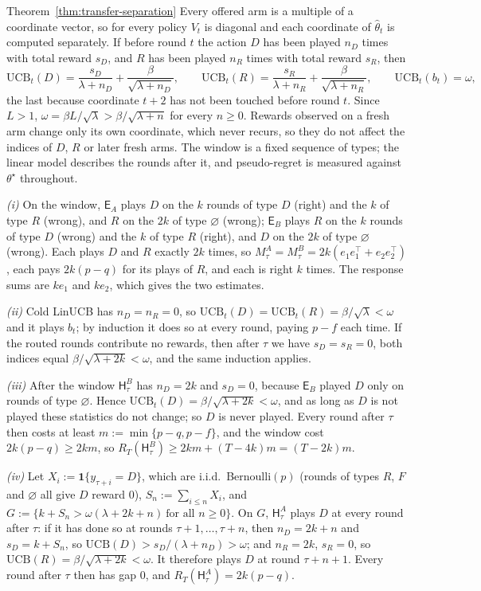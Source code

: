 \documentclass[anon]{alt2027} %
\newcommand{\ind}{\mathbf{1}}
\newcommand{\Exp}{\mathsf{E}}
\newcommand{\Hyb}{\mathsf{H}}
\begin{document}
\begin{proofof}{Theorem~\ref{thm:transfer-separation}}
Every offered arm is a multiple of a coordinate vector, so for every policy
$V_t$ is diagonal and each coordinate of $\widehat\theta_t$ is computed
separately. If before round $t$ the action $D$ has been played $n_D$ times with
total reward $s_D$, and $R$ has been played $n_R$ times with total reward
$s_R$, then
\[
\mathrm{UCB}_t(D)=\frac{s_D}{\lambda+n_D}+\frac{\beta}{\sqrt{\lambda+n_D}},\qquad
\mathrm{UCB}_t(R)=\frac{s_R}{\lambda+n_R}+\frac{\beta}{\sqrt{\lambda+n_R}},\qquad
\mathrm{UCB}_t(b_t)=\omega,
\]
the last because coordinate $t+2$ has not been touched before round $t$.
Since $L>1$, $\omega=\beta L/\sqrt\lambda>\beta/\sqrt{\lambda+n}$ for every
$n\ge0$. Rewards observed on a fresh arm change only its own coordinate, which
never recurs, so they do not affect the indices of $D$, $R$ or later fresh
arms. The window is a fixed sequence of types; the linear model describes the
rounds after it, and pseudo-regret is measured against $\theta^\star$
throughout.

\emph{(i)} On the window, $\Exp_A$ plays $D$ on the $k$ rounds of type $D$
(right) and the $k$ of type $R$ (wrong), and $R$ on the $2k$ of type
$\varnothing$ (wrong); $\Exp_B$ plays $R$ on the $k$ rounds of type $D$ (wrong)
and the $k$ of type $R$ (right), and $D$ on the $2k$ of type $\varnothing$
(wrong). Each plays $D$ and $R$ exactly $2k$ times, so
$M^A_\tau=M^B_\tau=2k(e_1e_1^\top+e_2e_2^\top)$, each pays $2k(p-q)$ for its
plays of $R$, and each is right $k$ times. The response sums are $ke_1$ and
$ke_2$, which gives the two estimates.

\emph{(ii)} Cold LinUCB has $n_D=n_R=0$, so $\mathrm{UCB}_t(D)=\mathrm{UCB}_t(R)
=\beta/\sqrt\lambda<\omega$ and it plays $b_t$; by induction it does so at every
round, paying $p-f$ each time. If the routed rounds contribute no rewards, then
after $\tau$ we have $s_D=s_R=0$, both indices equal $\beta/\sqrt{\lambda+2k}<\omega$,
and the same induction applies.

\emph{(iii)} After the window $\Hyb^B_\tau$ has $n_D=2k$ and $s_D=0$, because
$\Exp_B$ played $D$ only on rounds of type $\varnothing$. Hence
$\mathrm{UCB}_t(D)=\beta/\sqrt{\lambda+2k}<\omega$, and as long as $D$ is not
played these statistics do not change; so $D$ is never played. Every round
after $\tau$ then costs at least $m:=\min\{p-q,p-f\}$, and the window cost
$2k(p-q)\ge2km$, so $R_T(\Hyb^B_\tau)\ge2km+(T-4k)m=(T-2k)m$.

\emph{(iv)} Let $X_i:=\ind\{y_{\tau+i}=D\}$, which are i.i.d.\ Bernoulli$(p)$
(rounds of types $R$, $F$ and $\varnothing$ all give $D$ reward $0$),
$S_n:=\sum_{i\le n}X_i$, and
$G:=\{k+S_n>\omega(\lambda+2k+n)\ \text{for all }n\ge0\}$. On $G$, $\Hyb^A_\tau$
plays $D$ at every round after $\tau$: if it has done so at rounds
$\tau+1,\dots,\tau+n$, then $n_D=2k+n$ and $s_D=k+S_n$, so
$\mathrm{UCB}(D)>s_D/(\lambda+n_D)>\omega$; and $n_R=2k$, $s_R=0$, so
$\mathrm{UCB}(R)=\beta/\sqrt{\lambda+2k}<\omega$. It therefore plays $D$ at round
$\tau+n+1$. Every round after $\tau$ then has gap $0$, and
$R_T(\Hyb^A_\tau)=2k(p-q)$.


\end{proofof}
\end{document}

